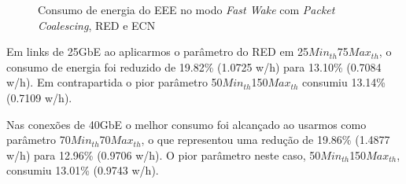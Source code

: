 \begin{figure}[!htb]
    \centering
    \label{fig:EEEFastWakePaCoREDECN}
    
    \hfill
    
    \caption{\centering Consumo de energia do EEE no modo \emph{Fast Wake} com \emph{Packet Coalescing}, RED e ECN}
\end{figure}

Em links de 25GbE ao aplicarmos o parâmetro do RED em 25{$\mathit{Min}_\mathit{th}$}75{$\mathit{Max}_\mathit{th}$}, o consumo de energia foi reduzido de 19.82\% (1.0725 w/h) para 13.10\% (0.7084 w/h). Em contrapartida o pior parâmetro 50{$\mathit{Min}_\mathit{th}$}150{$\mathit{Max}_\mathit{th}$} consumiu 13.14\% (0.7109 w/h).

Nas conexões de 40GbE o melhor consumo foi alcançado ao usarmos como parâmetro 70{$\mathit{Min}_\mathit{th}$}70{$\mathit{Max}_\mathit{th}$}, o que representou uma redução de 19.86\% (1.4877 w/h) para 12.96\% (0.9706 w/h). O pior parâmetro neste caso, 50{$\mathit{Min}_\mathit{th}$}150{$\mathit{Max}_\mathit{th}$}, consumiu 13.01\% (0.9743 w/h).

